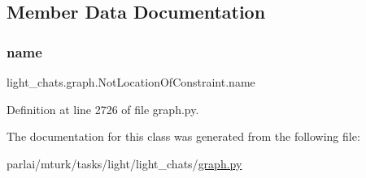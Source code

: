 \subsection{Member Data Documentation}
\mbox{\label{classlight__chats_1_1graph_1_1NotLocationOfConstraint_ace5fdafd6b230645ba96317bbf254c42}} 
\subsubsection{\texorpdfstring{name}{name}}
{\footnotesize\ttfamily light\+\_\+chats.\+graph.\+Not\+Location\+Of\+Constraint.\+name\hspace{0.3cm}{\ttfamily [static]}}



Definition at line 2726 of file graph.\+py.



The documentation for this class was generated from the following file\+:\begin{DoxyCompactItemize}
\item 
parlai/mturk/tasks/light/light\+\_\+chats/\hyperlink{parlai_2mturk_2tasks_2light_2light__chats_2graph_8py}{graph.\+py}\end{DoxyCompactItemize}
